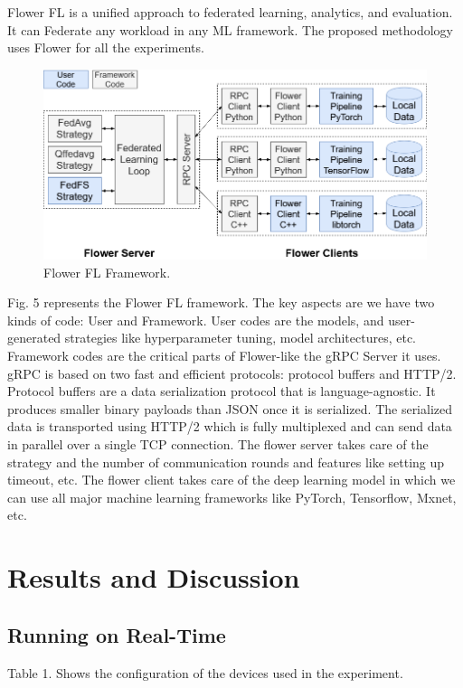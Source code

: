 \documentclass[conference]{IEEEtran}
\begin{document}
Flower FL \cite{beutel2020flower} is a unified approach to federated learning, analytics, and evaluation. It can Federate any workload in any ML framework. The proposed methodology uses Flower for all the experiments.
\begin{figure}[htp]
        \centering
        \includegraphics[scale=.25]{Images/flower-core-framework-architecture.png}
        \caption{Flower FL Framework.}
    \end{figure}
Fig. 5 represents the Flower FL framework. The key aspects are we have two kinds of code: User and Framework. User codes are the models, and user-generated strategies like hyperparameter tuning, model architectures, etc. Framework codes are the critical parts of Flower-like the gRPC Server it uses. gRPC is based on two fast and efficient protocols: protocol buffers and HTTP/2. Protocol buffers are a data serialization protocol that is language-agnostic. It produces smaller binary payloads than JSON once it is serialized. The serialized data is transported using HTTP/2 which is fully multiplexed and can send data in parallel over a single TCP connection. The flower server takes care of the strategy and the number of communication rounds and features like setting up timeout, etc. The flower client takes care of the deep learning model in which we can use all major machine learning frameworks like PyTorch, Tensorflow, Mxnet, etc.


\section{Results and Discussion}
\subsection{Running on Real-Time}
Table 1. Shows the configuration of the devices used in the experiment. 
\end{document}
